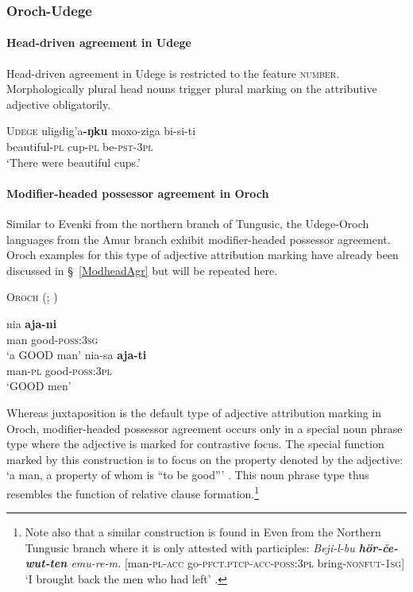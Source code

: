 \subsubsection{Oroch-Udege}
\paragraph{Head-driven agreement in Udege}
Head-driven agreement in Udege is restricted to the feature \textsc{number}. Morphologically plural head nouns trigger plural marking on the attributive adjective obligatorily.
\begin{exe}
\ex \textsc{Udege} \citep[468]{nikolaeva-etal2001}
\gll	uligdig'a\textbf{-ŋku} moxo-ziga bi-si-ti\\
	beautiful\textsc{-pl} cup\textsc{-pl} be\textsc{-pst-3pl}\\
\glt	‘There were beautiful cups.’
\end{exe}

\paragraph{Modifier-headed possessor agreement in Oroch}
Similar to Evenki from the northern branch of Tungusic, the Udege-Oroch languages from the Amur branch exhibit modifier-headed possessor agreement. Oroch examples for this type of adjective attribution marking have already been discussed in \S~\ref{ModheadAgr} but will be repeated here.
\begin{exe}
\ex \textsc{Oroch} (\citealt[207]{avrorin-etal1967}; \citealt[3]{malchukov2000}) \label{oroch modhead}
\begin{xlist}
\ex
\gll 	nia	\textbf{aja-ni}\\
	man good-\textsc{poss:3sg}\\
\glt	‘a GOOD man’
\ex
\gll nia-sa \textbf{aja-ti}\\	
	man-\textsc{pl} good-\textsc{poss:3pl}\\
\glt	‘GOOD men’
\end{xlist}
\end{exe}
Whereas juxtaposition is the default type of adjective attribution marking in Oroch, modifier-headed possessor agreement occurs only in a special noun phrase type where the adjective is marked for contrastive focus. The special function marked by this construction is to focus on the property denoted by the adjective: ‘a man, a property of whom is “to be good”’ \citep[3]{malchukov2000}. This noun phrase type thus resembles the function of relative clause formation.\footnote{Note also that a similar construction is found in Even from the Northern Tungusic branch where it is only attested with participles: \textit{Beji-l-bu \textbf{hör-če-wut-ten} emu-re-m.} [man-\textsc{pl}-\textsc{acc} go-\textsc{pfct.ptcp}-\textsc{acc}-\textsc{poss:3pl} bring-\textsc{nonfut}-\textsc{1sg}] ‘I brought back the men who had left’ \citep[31]{malchukov1995}.}

